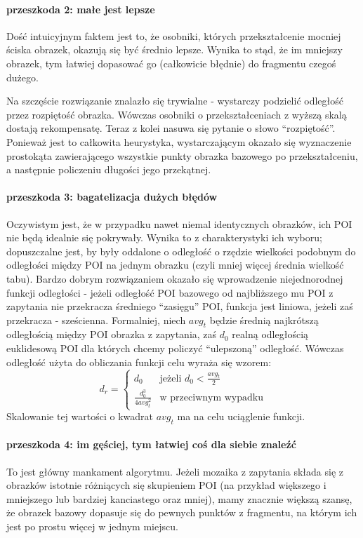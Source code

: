 \documentclass[a4paper,12pt,leqno]{article}
\begin{document}
\paragraph{przeszkoda 2: małe jest lepsze}
Dość intuicyjnym faktem jest to, że osobniki, których przekształcenie mocniej ściska obrazek, okazują się być średnio lepsze. Wynika to stąd, że im mniejszy obrazek, 
tym łatwiej dopasować go (całkowicie błędnie) do fragmentu czegoś dużego. 

Na szczęście rozwiązanie znalazło się trywialne - wystarczy podzielić odległość przez rozpiętość obrazka. Wówczas osobniki o przekształceniach z wyższą skalą dostają rekompensatę.
Teraz z kolei nasuwa się pytanie o słowo ``rozpiętość''. Ponieważ jest to całkowita heurystyka, wystarczającym okazało się wyznaczenie prostokąta zawierającego wszystkie punkty 
obrazka bazowego po przekształceniu, a następnie policzeniu długości jego przekątnej.

\paragraph{przeszkoda 3: bagatelizacja dużych błędów}
Oczywistym jest, że w przypadku nawet niemal identycznych obrazków, ich POI nie będą idealnie się pokrywały. Wynika to z charakterystyki ich wyboru; dopuszczalne jest, by były oddalone
o odległość o rzędzie wielkości podobnym do odległości między POI na jednym obrazku (czyli mniej więcej średnia wielkość tabu). 
Bardzo dobrym rozwiązaniem okazało się wprowadzenie niejednorodnej funkcji odległości - jeżeli odległość POI bazowego od najbliższego mu POI z zapytania nie przekracza średniego ``zasięgu''
POI, funkcja jest liniowa, jeżeli zaś przekracza - sześcienna.
Formalniej, niech $avg_t$ będzie średnią najkrótszą odległością między POI obrazka z zapytania, zaś $d_0$ realną odległością euklidesową POI dla których chcemy policzyć ``ulepszoną'' odległość.
Wówczas odległość użyta do obliczania funkcji celu wyraża się wzorem:
$$d_r = \left\{ \begin{array}{ll}
                d_0 & \text{jeżeli } d_0 < \frac{avg_t}{2} \\
		\frac{d_0^3}{4avg_t^2} & \text{w przeciwnym wypadku}
               \end{array} \right.$$
Skalowanie tej wartości o kwadrat $avg_t$ ma na celu uciąglenie funkcji.

\paragraph{przeszkoda 4: im gęściej, tym łatwiej coś dla siebie znaleźć}
To jest główny mankament algorytmu. Jeżeli mozaika z zapytania składa się z obrazków istotnie różniących się skupieniem POI 
(na przykład większego i mniejszego lub bardziej kanciastego oraz mniej), mamy znacznie większą szansę, że obrazek bazowy dopasuje się do pewnych punktów z fragmentu, 
na którym ich jest po prostu więcej w jednym miejscu.
\end{document}
